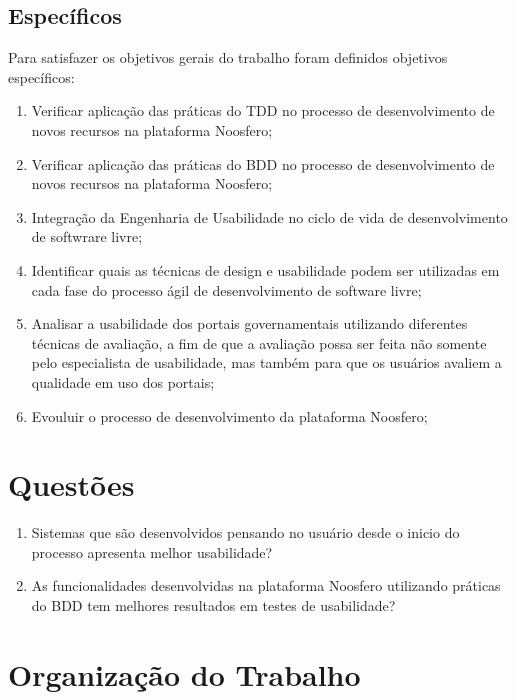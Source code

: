 	 
	 
	\subsection{Específicos}

	 Para satisfazer os objetivos gerais do trabalho foram definidos objetivos específicos:

	\begin{enumerate}
	\item Verificar aplicação das práticas do TDD no processo de desenvolvimento de novos recursos na plataforma Noosfero;
	\item Verificar aplicação das práticas do BDD no processo de desenvolvimento de novos recursos na plataforma Noosfero;
	\item Integração da Engenharia de Usabilidade no ciclo de vida de desenvolvimento de softwrare livre;
	\item Identificar quais as técnicas de design e usabilidade  podem ser utilizadas em cada fase do processo ágil de desenvolvimento de software livre;
	\item Analisar a usabilidade dos portais governamentais utilizando diferentes técnicas de avaliação, a fim de que a avaliação possa ser feita não somente pelo especialista de usabilidade, mas também para que os usuários avaliem a qualidade em uso dos portais;
	\item Evouluir o processo de desenvolvimento da plataforma Noosfero;
	\end{enumerate}

	\section{Questões}
	\begin{enumerate}
	\item Sistemas que são desenvolvidos pensando no usuário desde o inicio do processo apresenta melhor usabilidade?
	\item As funcionalidades desenvolvidas na plataforma Noosfero utilizando práticas do BDD tem melhores resultados em testes de usabilidade?

	\end{enumerate}
	 
	\section{Organização do Trabalho}
	 
